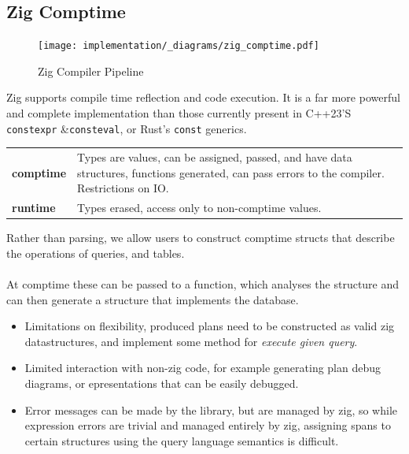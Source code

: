 \subsection{Zig Comptime}
\begin{figure}[h!]
    \centering
    \texttt{[image: implementation/\_diagrams/zig\_comptime.pdf]}
    \caption{Zig Compiler Pipeline}
\end{figure}
\noindent
Zig supports compile time reflection and code execution. It is a far more powerful and complete
implementation than those currently present in C++23'S \texttt{constexpr} \&\texttt{consteval},
or Rust's \texttt{const} generics.
\begin{center}
    \begin{tabular}{l p{}}
        \textbf{comptime} & Types are values, can be assigned, passed, and have data structures, functions generated, can pass errors to the compiler. Restrictions on IO. \\
        \textbf{runtime} & Types erased, access only to non-comptime values.                                                                                              \\
    \end{tabular}
\end{center}
Rather than parsing, we allow users to construct comptime structs that describe the operations of
queries, and tables.
\\
\\ At comptime these can be passed to a function, which analyses the structure and can then generate a structure that implements the database.
\begin{itemize}
    \setlength\itemsep{0em}
    \item Limitations on flexibility, produced plans need to be constructed as valid zig datastructures, and implement some method for \textit{execute given query}.
    \item Limited interaction with non-zig code, for example generating plan debug diagrams, or epresentations that can be easily debugged.
    \item Error messages can be made by the library, but are managed by zig, so while expression errors are trivial and managed entirely by zig, assigning spans to certain structures using the query language semantics is difficult.
\end{itemize}

